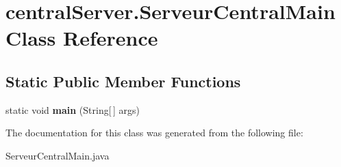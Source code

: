 \hypertarget{classcentralServer_1_1ServeurCentralMain}{}\section{central\+Server.\+Serveur\+Central\+Main Class Reference}
\label{classcentralServer_1_1ServeurCentralMain}
\subsection*{Static Public Member Functions}
\begin{DoxyCompactItemize}
\item 
\mbox{\label{classcentralServer_1_1ServeurCentralMain_a4a243b7e767f8cda08f3d9793182bbf9}} 
static void {\bfseries main} (String\mbox{[}$\,$\mbox{]} args)
\end{DoxyCompactItemize}


The documentation for this class was generated from the following file\+:\begin{DoxyCompactItemize}
\item 
Serveur\+Central\+Main.\+java\end{DoxyCompactItemize}
